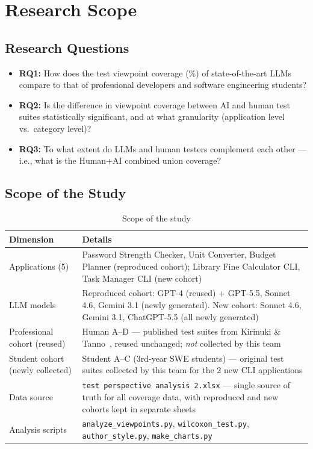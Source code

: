 \documentclass[12pt,a4paper]{article}
\begin{document}
\section{Research Scope}

\subsection*{Research Questions}
\begin{itemize}[leftmargin=1.2cm]
    \item \textbf{RQ1:} How does the test viewpoint coverage (\%) of state-of-the-art LLMs compare to that of professional developers and software engineering students?
    \item \textbf{RQ2:} Is the difference in viewpoint coverage between AI and human test suites statistically significant, and at what granularity (application level vs.\ category level)?
    \item \textbf{RQ3:} To what extent do LLMs and human testers complement each other --- i.e., what is the Human+AI combined union coverage?
\end{itemize}

\subsection*{Scope of the Study}
\begin{table}[H]
\centering
\caption{Scope of the study}
\label{tab:scope}
\begin{tabularx}{\textwidth}{lY}
\toprule
\textbf{Dimension} & \textbf{Details} \\
\midrule
Applications (5) & Password Strength Checker, Unit Converter, Budget Planner (reproduced cohort); Library Fine Calculator CLI, Task Manager CLI (new cohort) \\
LLM models & Reproduced cohort: GPT-4 (reused) + GPT-5.5, Sonnet 4.6, Gemini 3.1 (newly generated). New cohort: Sonnet 4.6, Gemini 3.1, ChatGPT-5.5 (all newly generated) \\
Professional cohort (reused) & Human A--D --- published test suites from Kirinuki \& Tanno~\cite{b1}, reused unchanged; \emph{not} collected by this team \\
Student cohort (newly collected) & Student A--C (3rd-year SWE students) --- original test suites collected by this team for the 2 new CLI applications \\
Data source & \texttt{test perspective analysis 2.xlsx} --- single source of truth for all coverage data, with reproduced and new cohorts kept in separate sheets \\
Analysis scripts & \texttt{analyze\_viewpoints.py}, \texttt{wilcoxon\_test.py}, \texttt{author\_style.py}, \texttt{make\_charts.py} \\
\bottomrule
\end{tabularx}
\end{table}
\end{document}
